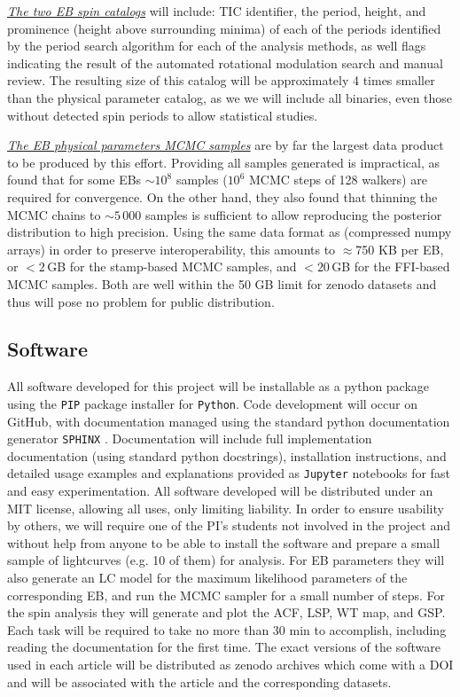 \textit{\underline{The two EB spin catalogs}} will include: TIC identifier, the
period, height, and prominence (height above surrounding minima) of each of the
periods identified by the period search algorithm for each of the analysis
methods, as well flags indicating the result of the automated rotational
modulation search and manual review. The resulting size of this catalog will be
approximately 4 times smaller than the physical parameter catalog, as we we will
include all binaries, even those without detected spin periods to allow
statistical studies.

\textit{\underline{The EB physical parameters MCMC samples}} are by far the
largest data product to be produced by this effort. Providing all samples
generated is impractical, as \citep{Windemuth_et_al_19} found that for some EBs
$\sim10^8$ samples ($10^6$ MCMC steps of 128 walkers) are required for
convergence. On the other hand, they also found that thinning the MCMC chains to
$\sim5\,000$ samples is sufficient to allow reproducing the posterior distribution
to high precision. Using the same data format as \citep{Windemuth_et_al_19}
(compressed numpy arrays) in order to preserve interoperability, this amounts to
$\approx$750 KB per EB, or $<2$\,GB for the stamp-based MCMC samples, and
$<20$\,GB for the FFI-based MCMC samples. Both are well within the 50 GB limit
for zenodo datasets and thus will pose no problem for public distribution.

\subsection{Software}
%
\label{sec:dmp_software}

All software developed for this project will be installable as a python package
using the \texttt{PIP} package installer \citep{pip} for \texttt{Python}. Code
development will occur on GitHub, with documentation managed using the standard
python documentation generator \texttt{SPHINX} \citep{SPHINX}. Documentation will
include full implementation documentation (using standard python docstrings),
installation instructions, and detailed usage examples and explanations provided
as \texttt{Jupyter} notebooks for fast and easy experimentation. All software
developed will be distributed under an MIT license, allowing all uses, only
limiting liability. In order to ensure usability by others, we will require one
of the PI's students not involved in the project and without help from anyone to
be able to install the software and prepare a small sample of lightcurves (e.g.
10 of them) for analysis. For EB parameters they will also generate an LC model
for the maximum likelihood parameters of the corresponding EB, and run the MCMC
sampler for a small number of steps. For the spin analysis they will generate
and plot the ACF, LSP, WT map, and GSP. Each task will be required to take no
more than 30 min to accomplish, including reading the documentation for the
first time. The exact versions of the software used in each article will be
distributed as zenodo archives which come with a DOI and will be associated with
the article and the corresponding datasets.
